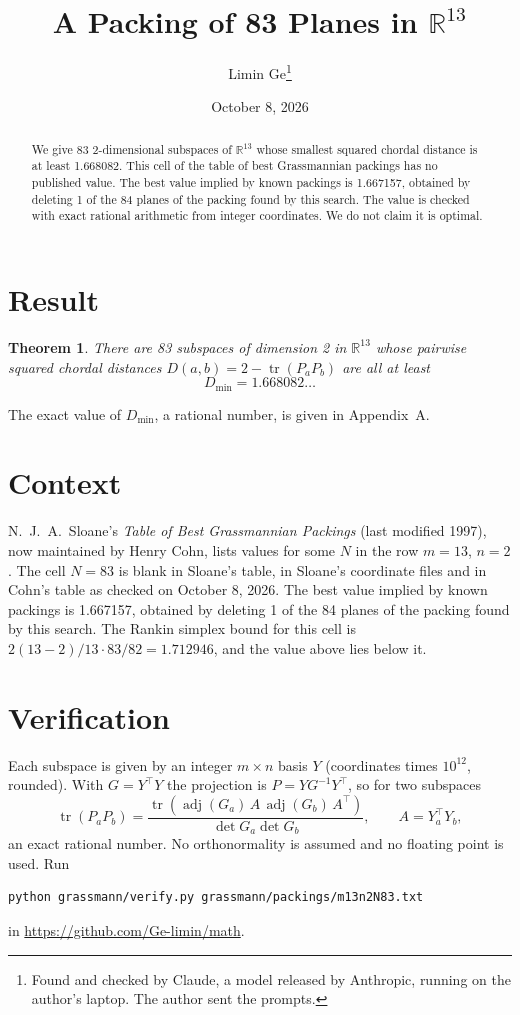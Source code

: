 \documentclass[11pt,a4paper]{article}
\title{A Packing of 83 Planes in $\mathbb{R}^{13}$}
\author{Limin Ge\thanks{Found and checked by Claude, a model released by Anthropic, running on the author's laptop. The author sent the prompts.}}
\date{October 8, 2026}
\newtheorem*{theorem}{Theorem}
\begin{document}
\maketitle
\begin{abstract}
We give 83 2-dimensional subspaces of $\mathbb{R}^{13}$ whose smallest squared chordal distance is at least 1.668082. This cell of the table of best Grassmannian packings has no published value. The best value implied by known packings is 1.667157, obtained by deleting 1 of the 84 planes of the packing found by this search. The value is checked with exact rational arithmetic from integer coordinates. We do not claim it is optimal.
\end{abstract}

\section{Result}
\begin{theorem}
There are 83 subspaces of dimension 2 in $\mathbb{R}^{13}$ whose pairwise squared chordal distances $D(a,b) = 2 - \operatorname{tr}(P_aP_b)$ are all at least
\[ D_{\min} = 1.668082\ldots \]
\end{theorem}
The exact value of $D_{\min}$, a rational number, is given in Appendix~A.


\section{Context}
N.~J.~A.~Sloane's \emph{Table of Best Grassmannian Packings} (last modified 1997), now maintained by Henry Cohn, lists values for some $N$ in the row $m=13$, $n=2$. The cell $N=83$ is blank in Sloane's table, in Sloane's coordinate files and in Cohn's table as checked on October 8, 2026. The best value implied by known packings is 1.667157, obtained by deleting 1 of the 84 planes of the packing found by this search. The Rankin simplex bound for this cell is $2(13-2)/13\cdot 83/82 = 1.712946$, and the value above lies below it.


\section{Verification}
Each subspace is given by an integer $m\times n$ basis $Y$ (coordinates times $10^{12}$, rounded). With $G=Y^\top Y$ the projection is $P=YG^{-1}Y^\top$, so for two subspaces
\[ \operatorname{tr}(P_aP_b)=\frac{\operatorname{tr}(\operatorname{adj}(G_a)\,A\,\operatorname{adj}(G_b)\,A^\top)}{\det G_a\det G_b},\qquad A=Y_a^\top Y_b, \]
an exact rational number. No orthonormality is assumed and no floating point is used. Run
\begin{verbatim}
python grassmann/verify.py grassmann/packings/m13n2N83.txt
\end{verbatim}
in \url{https://github.com/Ge-limin/math}.
\end{document}
